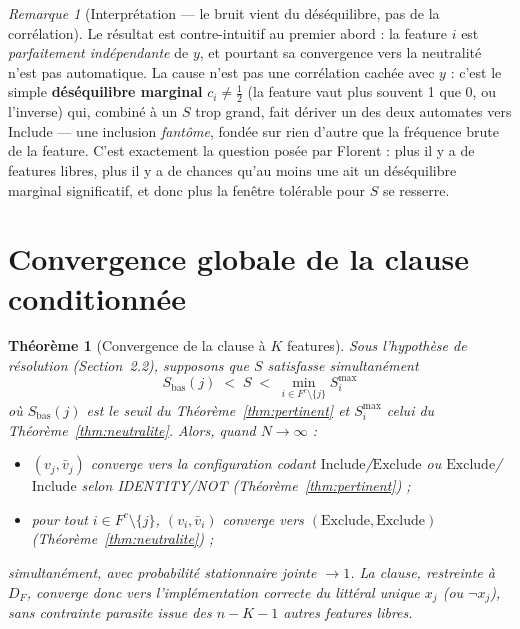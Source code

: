 \documentclass[12pt,a4paper]{article}
\newtheorem{theorem}{Théorème}[section]
\theoremstyle{remark}
\newtheorem{remark}{Remarque}[section]
\newcommand{\Inc}{\ensuremath{\mathrm{Include}}}
\newcommand{\Exc}{\ensuremath{\mathrm{Exclude}}}
\newcommand{\vbar}{\bar{v}}
\newcommand{\DF}{D_F}
\begin{document}
\begin{remark}[Interprétation --- le bruit vient du déséquilibre, pas de la
corrélation]
Le résultat est contre-intuitif au premier abord : la feature $i$ est \emph{parfaitement
indépendante} de $y$, et pourtant sa convergence vers la neutralité n'est pas
automatique. La cause n'est pas une corrélation cachée avec $y$ : c'est le simple
\textbf{déséquilibre marginal} $c_i\ne\tfrac12$ (la feature vaut plus souvent 1 que
0, ou l'inverse) qui, combiné à un $S$ trop grand, fait dériver un des deux
automates vers \Inc{} --- une inclusion \emph{fantôme}, fondée sur rien d'autre que
la fréquence brute de la feature. C'est exactement la question posée par Florent :
plus il y a de features libres, plus il y a de chances qu'au moins une ait un
déséquilibre marginal significatif, et donc plus la fenêtre tolérable pour $S$ se
resserre.
\end{remark}

\section{Convergence globale de la clause conditionnée}

\begin{theorem}[Convergence de la clause à $K$ features]\label{thm:global}
Sous l'hypothèse de résolution (Section~2.2), supposons que $S$ satisfasse
simultanément
\[
  \boxed{\;S_{\text{bas}}(j) \;<\; S \;<\; \min_{i\in F^c\setminus\{j\}} S_i^{\max}\;}
\]
où $S_{\text{bas}}(j)$ est le seuil du Théorème~\ref{thm:pertinent} et $S_i^{\max}$
celui du Théorème~\ref{thm:neutralite}. Alors, quand $N\to\infty$ :
\begin{itemize}
  \item $(v_j,\vbar_j)$ converge vers la configuration codant \Inc/\Exc{} ou
  \Exc/\Inc{} selon IDENTITY/NOT (Théorème~\ref{thm:pertinent}) ;
  \item pour tout $i\in F^c\setminus\{j\}$, $(v_i,\vbar_i)$ converge vers
  $(\Exc,\Exc)$ (Théorème~\ref{thm:neutralite}) ;
\end{itemize}
simultanément, avec probabilité stationnaire jointe $\to 1$. La clause, restreinte
à $\DF$, converge donc vers l'implémentation correcte du littéral unique $x_j$ (ou
$\neg x_j$), sans contrainte parasite issue des $n-K-1$ autres features libres.
\end{theorem}
\end{document}
